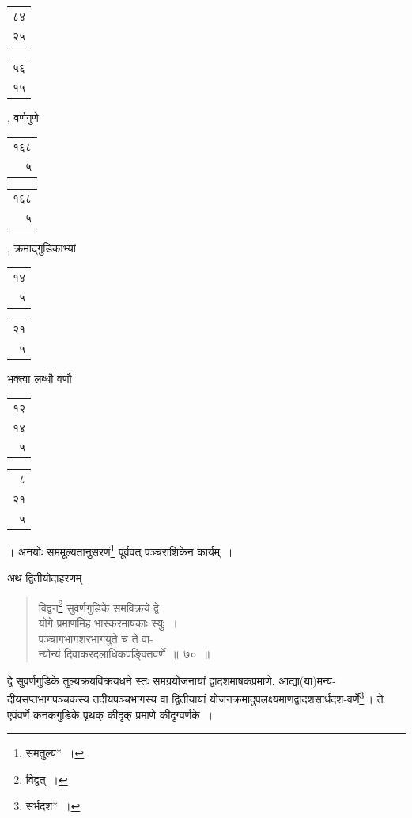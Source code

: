 \documentclass[10pt, openany]{book}
\begin{document}
{{{\begin{tabular}{r|}८४ \\२५ \end{tabular}\begin{tabular}{r}५६\\ १५\end{tabular}, वर्णगुणे\begin{tabular}{r|}१६८ \\५ \end{tabular}\begin{tabular}{r}१६८ \\५\end{tabular}, क्रमाद्गुडिकाभ्यां \begin{tabular}{r|}१४\\ ५\end{tabular}\begin{tabular}{r}२१\\ ५\end{tabular}}{भक्त्वा लब्धौ वर्णौ\begin{tabular}{r|}१२\\ १४\\ ५\end{tabular}\begin{tabular}{r}८ \\२१\\ ५\end{tabular}। अनयोः सममूल्यतानुसरणं\renewcommand{\thefootnote}{\s ११}\footnote{\s समतुल्य*~।}
पूर्ववत् पञ्चराशिकेन कार्यम्~।}

\vspace{2mm}
{अथ द्वितीयोदाहरणम्\textemdash}
\vspace{-1mm}

\begin{quote}
    
{\eg विद्वन्\renewcommand{\thefootnote}{\s १२}\footnote{\s विद्वत्~।} सुवर्णगुडिके समविक्रये द्वे \\
 योगे प्रमाणमिह भास्करमाषकाः स्युः~। \\
 पञ्चागभागशरभागयुते च ते वा- \\
 न्योन्यं दिवाकरदलाधिकपङ्क्तिवर्णे~॥~७०~॥}\end{quote}
\vspace{-1mm}

{द्वे सुवर्णगुडिके तुल्यक्रयविक्रयधने स्तः समग्रयोजनायां
द्वादशमाषकप्रमाणे, आद्या(या)मन्य-दीयसप्तभागपञ्चकस्य तदीयपञ्चभागस्य वा द्वितीयायां
योजनक्रमादुपलक्ष्यमाणद्वादशसार्धदश-वर्णे\renewcommand{\thefootnote}{\s १३}\footnote{\s *सर्भदश*~।}\,। ते एवंवर्णे कनकगुडिके पृथक् कीदृक् प्रमाणे कीदृग्वर्णके~।}

}}
\end{document}
